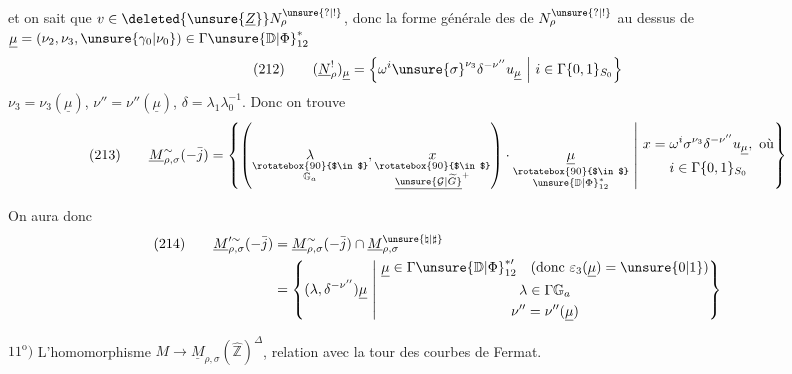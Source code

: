 et on sait que $v\in\deleted{\unsure{\underline Z}}
N_\rho^{\unsure{?|!}}$, donc la forme
générale des 
de $N_\rho^{\unsure{?|!}}$ au dessus de
$\underline\mu=(\nu_2,\nu_3,\unsure{\gamma_0|\nu_0})
\in\Gamma\unsure{\mathbb D|\Phi}_{12}^{*}$
\[
(212)\qquad
(\underline N_\rho^{!})_{\underline\mu}
=\left\{\omega^{i}\unsure{\sigma}^{\nu_3}\delta^{-\nu''}
u_{\underline\mu}\ \middle|\
i\in\Gamma\{0,1\}_{S_0}\right\}
\]
$\nu_3=\nu_3(\underline\mu)$,
$\nu''=\nu''(\underline\mu)$,
$\delta=\lambda_1\lambda_0^{-1}$. Donc on trouve
\[
\begin{aligned}
(213)\qquad
\underline M_{\rho,\sigma}^{\sim}(-\bar j)
=\left\{\left(
\underset{\substack{\rotatebox{90}{$\in$}\\\mathbb G_a}}{\lambda},
\underset{\substack{\rotatebox{90}{$\in$}\\
\underline{\unsure{\mathcal G|\widetilde G}}^{+}}}{x}
\right)\cdot
\underset{\substack{\rotatebox{90}{$\in$}\\
\unsure{\mathbb D|\Phi}_{12}^{*}}}{\underline\mu}
\ \middle|\
\begin{gathered}
x=\omega^{i}\sigma^{\nu_3}\delta^{-\nu''}u_{\underline\mu},\ \text{où}\\
i\in\Gamma\{0,1\}_{S_0}
\end{gathered}\right\}
\end{aligned}
\]

On aura donc
\[
\begin{aligned}
(214)\qquad
\underline M_{\rho,\sigma}^{\prime\sim}(-\bar j)
&=\underline M_{\rho,\sigma}^{\sim}(-\bar j)\cap
\underline M_{\rho,\sigma}^{\unsure{\natural|\sharp}}\\
&=\left\{(\lambda,\delta^{-\nu''})\underline\mu
\ \middle|\
\begin{gathered}
\underline\mu\in\Gamma\unsure{\mathbb D|\Phi}_{12}^{*\prime}
\quad(\text{donc }\varepsilon_3(\underline\mu)=\unsure{0|1})\\
\lambda\in\Gamma\mathbb G_a\\
\nu''=\nu''(\underline\mu)
\end{gathered}\right\}
\end{aligned}
\]

$11^{\mathrm o})$ L'homomorphisme
$M\longrightarrow\underline M_{\rho,\sigma}(\widehat{\mathbb Z})^{\Delta}$,
relation avec la tour des courbes de Fermat.

